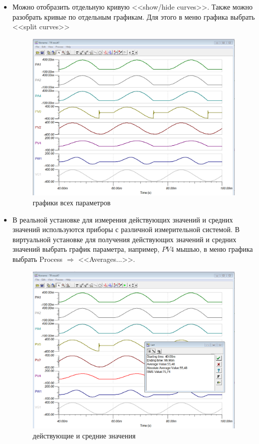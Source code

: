\begin{itemize}
\item Можно отобразить отдельную кривую <<show/hide curves>>. Также можно разобрать кривые по отдельным графикам. 
	Для этого в меню графика выбрать <<split curves>>
\begin{figure}[!ht]
\centering
\includegraphics[scale=0.3]{result_splitted}
\caption{графики всех параметров}
\label{result_splitted}
\end{figure}  

\item В реальной установке для измерения действующих значений и средних значений используются приборы с различной
	измерительной системой. В виртуальной установке для получения действующих значений и средних значений
	выбрать график параметра, например, $PV4$ мышью, в меню графика выбрать Process $\Rightarrow$ <<Averages...>>.
\begin{figure}[!ht]
\centering
\includegraphics[scale=0.3]{result_rms_avg}
\caption{действующие и средние значения}
\label{result_rms_avg}
\end{figure}


\end{itemize}
